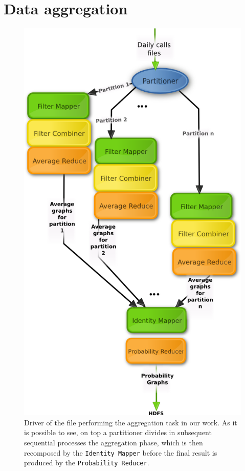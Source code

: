 \newpage
\section{Data aggregation}
\label{aggregation}
\begin{figure}[H]
	\centering
    \includegraphics[scale=0.6]{aggregated.png}
    \caption{Driver of the file performing the aggregation task in our work. As it is possible to see, on top
    a partitioner divides in subsequent sequential processes the aggregation phase, which is then recomposed by the \texttt{Identity Mapper} before the final result is produced by the \texttt{Probability Reducer}.}
    \label{fig:aggregated}
\end{figure}

